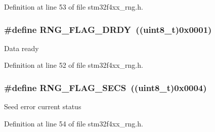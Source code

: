 Definition at line 53 of file stm32f4xx\-\_\-rng.\-h.

\hypertarget{group___r_n_g__flags__definition_ga25845be03c05930bde3c03975eb6c44f}{
\subsubsection[{R\-N\-G\-\_\-\-F\-L\-A\-G\-\_\-\-D\-R\-D\-Y}]{\setlength{\rightskip}{0pt plus 5cm}\#define R\-N\-G\-\_\-\-F\-L\-A\-G\-\_\-\-D\-R\-D\-Y~((uint8\-\_\-t)0x0001)}}\label{group___r_n_g__flags__definition_ga25845be03c05930bde3c03975eb6c44f}
Data ready 

Definition at line 52 of file stm32f4xx\-\_\-rng.\-h.

\hypertarget{group___r_n_g__flags__definition_ga0a3a6b3d5e584f04546cbcfe0b4fdac3}{
\subsubsection[{R\-N\-G\-\_\-\-F\-L\-A\-G\-\_\-\-S\-E\-C\-S}]{\setlength{\rightskip}{0pt plus 5cm}\#define R\-N\-G\-\_\-\-F\-L\-A\-G\-\_\-\-S\-E\-C\-S~((uint8\-\_\-t)0x0004)}}\label{group___r_n_g__flags__definition_ga0a3a6b3d5e584f04546cbcfe0b4fdac3}
Seed error current status 

Definition at line 54 of file stm32f4xx\-\_\-rng.\-h.

